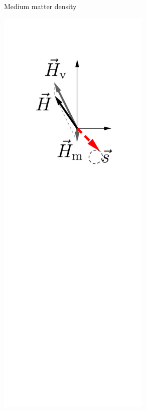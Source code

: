 \begin{figure}[htbp]
\begin{subfigure}[t]{0.3\textwidth}
		\caption{Medium matter density}\label{chap:basics-sec:flavor-isospin-pic-fig:msw-adiabatic-medium-density}
	\end{subfigure}
	\quad
	\begin{subfigure}[t]{0.3\textwidth}
		\centering
		\includegraphics[width=0.8\textwidth]{chapters/assets/matter/matter-effect-adiabatic-3}

\end{subfigure}
\end{figure}
